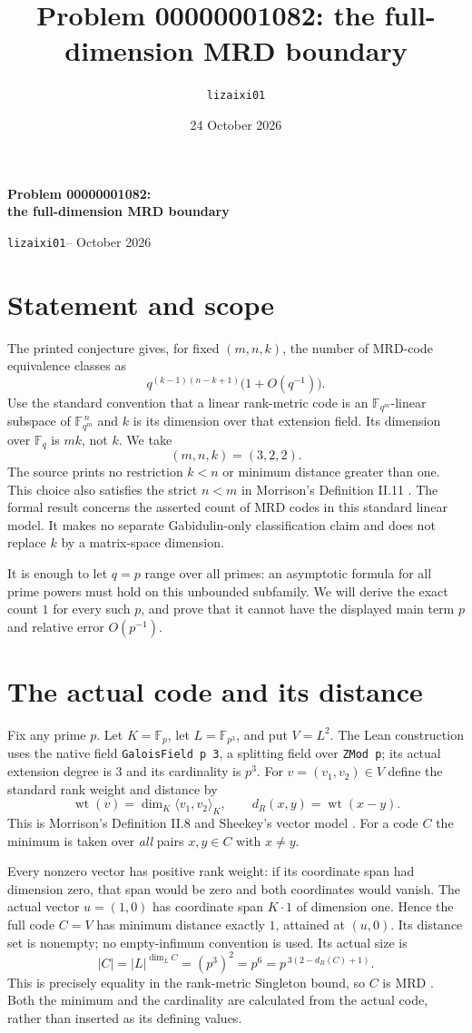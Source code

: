 \documentclass[10pt,a4paper]{article}
\title{Problem 00000001082: the full-dimension MRD boundary}
\author{\texttt{lizaixi01}}
\date{24 October 2026}
\newcommand{\F}{\mathbb F}
\newcommand{\wt}{\operatorname{wt}}
\begin{document}
\begin{center}
{\Large\bfseries Problem 00000001082:\\the full-dimension MRD boundary}\par
\smallskip
\texttt{lizaixi01}\quad --  October 2026
\end{center}

\section*{Statement and scope}
The printed conjecture gives, for fixed $(m,n,k)$, the number of MRD-code
equivalence classes as
\[
  q^{(k-1)(n-k+1)}\bigl(1+O(q^{-1})\bigr).
\]
Use the standard convention that a linear rank-metric code is an
$\F_{q^m}$-linear subspace of $\F_{q^m}^{\,n}$ and $k$ is its dimension
over that extension field. Its dimension over $\F_q$ is $mk$, not $k$.
We take
\[
  (m,n,k)=(3,2,2).
\]
The source prints no restriction $k<n$ or minimum distance greater than one.
This choice also satisfies the strict $n<m$ in Morrison's Definition II.11
\cite{Morrison}. The formal result concerns the asserted count of MRD codes
in this standard linear model. It makes no separate Gabidulin-only
classification claim and does not replace $k$ by a matrix-space dimension.

It is enough to let $q=p$ range over all primes: an asymptotic formula for
all prime powers must hold on this unbounded subfamily. We will derive the
exact count $1$ for every such $p$, and prove that it cannot have the
displayed main term $p$ and relative error $O(p^{-1})$.

\section*{The actual code and its distance}
Fix any prime $p$. Let $K=\F_p$, let $L=\F_{p^3}$, and put $V=L^2$.
The Lean construction uses the native field
\texttt{GaloisField p 3}, a splitting field over \texttt{ZMod p}; its
actual extension degree is $3$ and its cardinality is $p^3$.
For $v=(v_1,v_2)\in V$ define the standard rank weight and distance by
\[
 \wt(v)=\dim_K\langle v_1,v_2\rangle_K,
 \qquad d_R(x,y)=\wt(x-y).
\]
This is Morrison's Definition II.8 and Sheekey's vector model
\cite{Morrison,Sheekey}. For a code $C$ the minimum is taken over
\emph{all} pairs $x,y\in C$ with $x\ne y$.

Every nonzero vector has positive rank weight: if its coordinate span had
dimension zero, that span would be zero and both coordinates would vanish.
The actual vector $u=(1,0)$ has coordinate span $K\cdot1$ of dimension
one. Hence the full code $C=V$ has minimum distance exactly $1$, attained
at $(u,0)$. Its distance set is nonempty; no empty-infimum convention is used.
Its actual size is
\[
 |C|=|L|^{\dim_L C}=(p^3)^2=p^6
     =p^{\,3(2-d_R(C)+1)}.
\]
This is precisely equality in the rank-metric Singleton bound, so $C$ is
MRD \cite{Sheekey}. Both the minimum and the cardinality are calculated
from the actual code, rather than inserted as its defining values.
\end{document}
